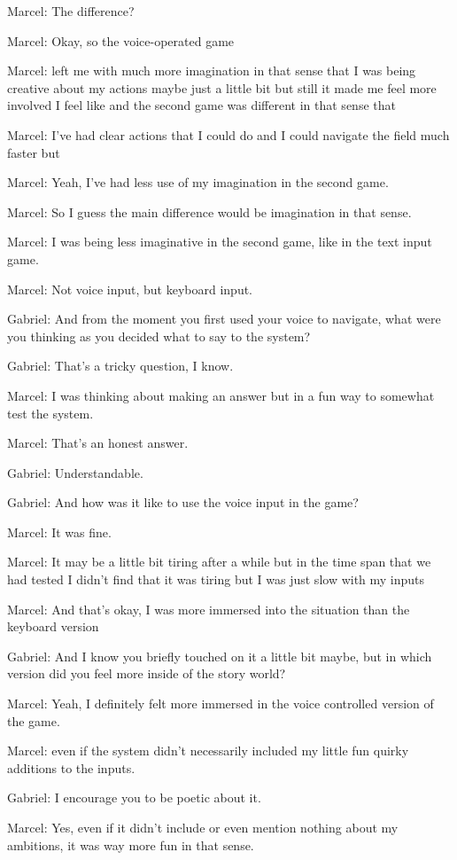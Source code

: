 Marcel: The difference?

Marcel: Okay, so the voice-operated game

Marcel: left me with much more imagination in that sense that I was being creative about my actions maybe just a little bit but still it made me feel more involved I feel like and the second game was different in that sense that

Marcel: I've had clear actions that I could do and I could navigate the field much faster but

Marcel: Yeah, I've had less use of my imagination in the second game.

Marcel: So I guess the main difference would be imagination in that sense.

Marcel: I was being less imaginative in the second game, like in the text input game.

Marcel: Not voice input, but keyboard input.

Gabriel: And from the moment you first used your voice to navigate, what were you thinking as you decided what to say to the system?

Gabriel: That's a tricky question, I know.

Marcel: I was thinking about making an answer but in a fun way to somewhat test the system.

Marcel: That's an honest answer.

Gabriel: Understandable.

Gabriel: And how was it like to use the voice input in the game?

Marcel: It was fine.

Marcel: It may be a little bit tiring after a while but in the time span that we had tested I didn't find that it was tiring but I was just slow with my inputs

Marcel: And that's okay, I was more immersed into the situation than the keyboard version

Gabriel: And I know you briefly touched on it a little bit maybe, but in which version did you feel more inside of the story world?

Marcel: Yeah, I definitely felt more immersed in the voice controlled version of the game.

Marcel: even if the system didn't necessarily included my little fun quirky additions to the inputs.

Gabriel: I encourage you to be poetic about it.

Marcel: Yes, even if it didn't include or even mention nothing about my ambitions, it was way more fun in that sense.

